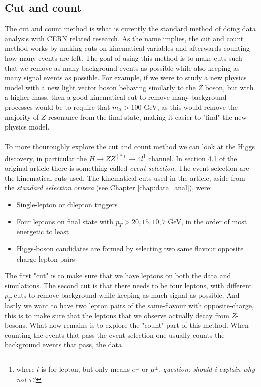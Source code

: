 \documentclass[14pt, a4paper]{book}
\begin{document}
\subsection{Cut and count}
The cut and count method is what is curently the standard method of doing data analysis with CERN related research. As the name implies, the cut and count method works by making cuts on kinematical variables and afterwards counting how many events are left. 
The goal of using this method is to make cuts such that we remove as many background events as possible while also keeping as many signal events as possible. For example, if we were to study a new physics model with a new light vector boson behaving similarly to the $Z$ boson, but with a higher mass, 
then a good kinematical cut to remove many background processes would be to require that $m_{ll}>100$ GeV, as this would remove the majority of $Z$-resonance from the final state, making it easier to "find" the new physics model. \\
\\To more thouroughly explore the cut and count method we can look at the Higgs discovery, in particular the $H\rightarrow ZZ^{(*)} \rightarrow 4l$\footnote{where $l$ is for lepton, but only means $e^\pm$ or $\mu^\pm$. \textit{question: should i explain why not $\tau$?}} channel. 
In section 4.1 of the original article \cite{Higgs_discovery_2012} there is something called \textit{event selection}. The event selection are the kinematical cuts used. The kinematical cuts used in the article, aside from the \textit{standard selection critera} 
(see Chapter \ref{chap:data_anal}), were:
\begin{itemize}
    \item Single-lepton or dilepton triggers
    \item Four leptons on final state with $p_T >20,15,10,7$ GeV, in the order of most energetic to least
    \item Higgs-boson candidates are formed by selecting two same flavour opposite charge lepton pairs
\end{itemize}
The first "cut" is to make sure that we have leptons on both the data and simulations. The second cut is that there needs to be four leptons, with different $p_T$ cuts to remove background while keeping as much signal as possible. And lastly we want to have two lepton pairs of the same-flavour 
with opposite-charge, this is to make sure that the leptons that we observe actually decay from $Z$-bosons. What now remains is to explore the "count" part of this method. When counting the events that pass the event selection one usually counts the background events that pass, the data 
\end{document}
